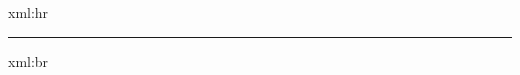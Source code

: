 \startxmlsetups xml:hr
  \blank
  \hrule
  \blank
\stopxmlsetups

\startxmlsetups xml:br
  \par
\stopxmlsetups
